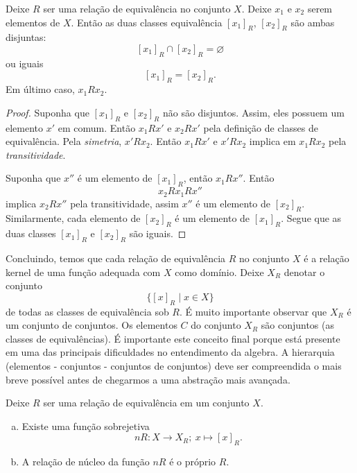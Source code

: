 \begin{stat}\label{PropLag1}
  Deixe $R$ ser uma relação de equivalência no conjunto $X$. Deixe $x_{1}$ e $x_{2}$ serem elementos de $X$. Então as duas classes equivalência $\left[x_{1}\right]_{R}$, $\left[x_{2}\right]_{R}$ são ambas disjuntas: $$\left[x_{1}\right]_{R} \cap \left[x_{2}\right]_{R} = \varnothing$$ ou iguais $$\left[x_{1}\right]_{R} = \left[x_{2}\right]_{R}.$$ Em último caso, $x_{1} R x_{2}$.
  \begin{proof}
    Suponha que $\left[x_{1}\right]_{R}$ e $\left[x_{2}\right]_{R}$ não são disjuntos. Assim, eles possuem um elemento $x'$ em comum. Então $x_{1} R x'$ e $x_{2} R x'$ pela definição de classes de equivalência. Pela \emph{simetria}, $x' R x_{2}$. Então $x_{1} R x'$ e $x' R x_{2}$ implica em $x_{1} R x_{2}$ pela \emph{transitividade}.

    Suponha que $x''$ é um elemento de $\left[x_{1}\right]_{R}$, então $x_{1} R x''$. Então $$ x_{2} R x_{1} R x''$$ implica $x_{2} R x''$ pela transitividade, assim $x''$ é um elemento de $\left[x_{2}\right]_{R}$. Similarmente, cada elemento de $\left[x_{2}\right]_{R}$ é um elemento de $\left[x_{1}\right]_{R}$. Segue que as duas classes $\left[x_{1}\right]_{R}$ e $\left[x_{2}\right]_{R}$ são iguais.
  \end{proof}
\end{stat}
Concluindo, temos que cada relação de equivalência $R$ no conjunto $X$ é a relação kernel de uma função adequada com $X$ como domínio. Deixe $X_{R}$ denotar o conjunto $$\{\left[x\right]_{R} \mid x \in X\}$$ de todas as classes de equivalência sob $R$. É muito importante observar que $X_{R}$ é um conjunto de conjuntos. Os elementos $C$ do conjunto $X_{R}$ são conjuntos (as classes de equivalências). É importante este conceito final porque está presente em uma das principais dificuldades no entendimento da algebra. A hierarquia (elementos - conjuntos - conjuntos de conjuntos) deve ser compreendida o mais breve possível antes de chegarmos a uma abstração mais avançada.

\begin{stat}
  Deixe $R$ ser uma relação de equivalência em um conjunto $X$.
  \begin{enumerate}[(a)]
    \item Existe uma função sobrejetiva $$nR: X\to X_{R};\ x\mapsto \left[x\right]_{R}.$$
    \item A relação de núcleo da função $nR$ é o próprio $R$.
  \end{enumerate}
\end{stat}
\newpage

